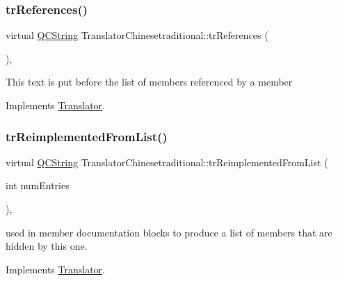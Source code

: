 \subsubsection{\texorpdfstring{trReferences()}{trReferences()}}
{\footnotesize\ttfamily virtual \mbox{\hyperlink{class_q_c_string}{Q\+C\+String}} Translator\+Chinesetraditional\+::tr\+References (\begin{DoxyParamCaption}{ }\end{DoxyParamCaption})\hspace{0.3cm}{\ttfamily [inline]}, {\ttfamily [virtual]}}

This text is put before the list of members referenced by a member 

Implements \mbox{\hyperlink{class_translator}{Translator}}.

\mbox{\label{class_translator_chinesetraditional_a4123a9a2bd28068e475392efd4651c42}} 
\subsubsection{\texorpdfstring{trReimplementedFromList()}{trReimplementedFromList()}}
{\footnotesize\ttfamily virtual \mbox{\hyperlink{class_q_c_string}{Q\+C\+String}} Translator\+Chinesetraditional\+::tr\+Reimplemented\+From\+List (\begin{DoxyParamCaption}\item[{int}]{num\+Entries }\end{DoxyParamCaption})\hspace{0.3cm}{\ttfamily [inline]}, {\ttfamily [virtual]}}

used in member documentation blocks to produce a list of members that are hidden by this one. 

Implements \mbox{\hyperlink{class_translator}{Translator}}.

\mbox{\label{class_translator_chinesetraditional_aca576368f45551caeec96ea9d69ec408}} 

